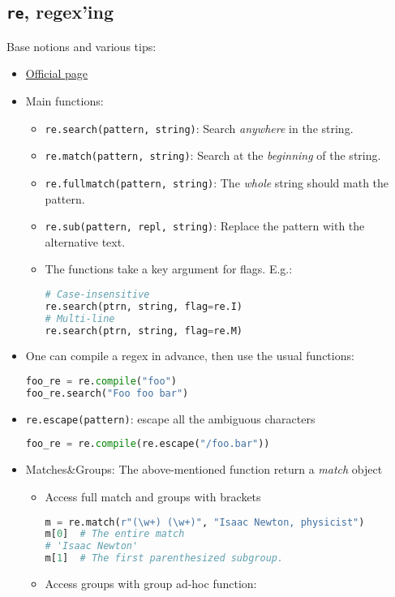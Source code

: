 \documentclass[a4paper,12pt,%
              final%
              ]{article}
\begin{document}
\subsection{\texttt{re}, regex'ing}
Base notions and various tips:
\begin{itemize}
  \item \href{https://docs.python.org/3/library/re.html}{Official page}
  \item Main functions:
    \begin{itemize}
      \item \verb|re.search(pattern, string)|: Search \emph{anywhere} in the string.
      \item \verb|re.match(pattern, string)|: Search at the \emph{beginning} of the string.
      \item \verb|re.fullmatch(pattern, string)|: The \emph{whole} string should math the pattern.
      \item \verb|re.sub(pattern, repl, string)|: Replace the pattern with the alternative text.
      \item The functions take a key argument for flags. E.g.:
\begin{lstlisting}[language=python]
# Case-insensitive
re.search(ptrn, string, flag=re.I)
# Multi-line
re.search(ptrn, string, flag=re.M)
\end{lstlisting}
    \end{itemize}
  \item One can compile a regex in advance, then use the usual functions:
\begin{lstlisting}[language=python]
foo_re = re.compile("foo")
foo_re.search("Foo foo bar")
\end{lstlisting}
  \item \verb|re.escape(pattern)|: escape all the ambiguous characters
\begin{lstlisting}[language=python]
foo_re = re.compile(re.escape("/foo.bar"))
\end{lstlisting}
  \item Matches\&Groups: The above-mentioned function return a \emph{match} object
    \begin{itemize}
      \item Access full match and groups with brackets
\begin{lstlisting}[language=python]
m = re.match(r"(\w+) (\w+)", "Isaac Newton, physicist")
m[0]  # The entire match
# 'Isaac Newton'
m[1]  # The first parenthesized subgroup.
\end{lstlisting}
      \item Access groups with group ad-hoc function:

\end{itemize}
\end{itemize}
\end{document}
